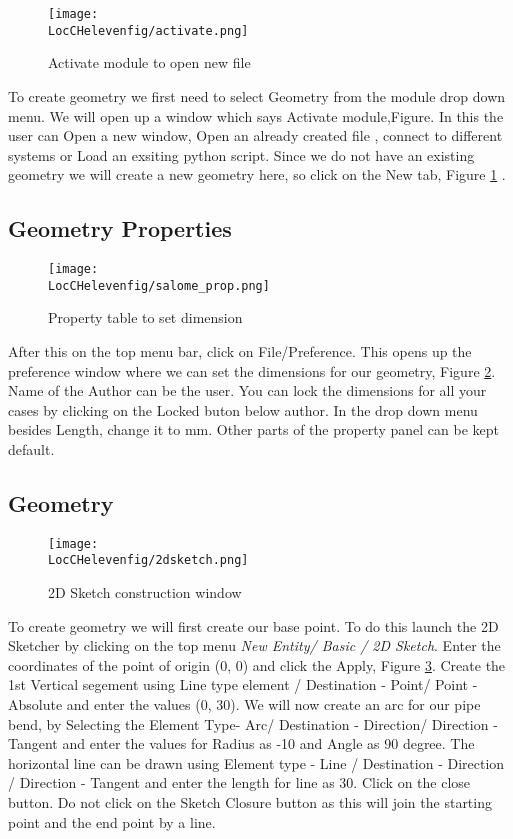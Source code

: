 \begin{figure}[h]  
\centering
\texttt{[image: \\LocCHelevenfig/activate.png]}
\caption{Activate module to open new file}
\label{activate}
\end{figure}

To create geometry we first need to select Geometry from the module drop down menu. We will open up a window which says Activate module,Figure. In this the user can Open a new window, Open an already created file , connect to different systems or Load an exsiting python script. Since we do not have an existing geometry we will create a new geometry here, so click on the New tab, Figure \ref{activate} . 

\subsection*{Geometry Properties}

\begin{figure}[h]  
\centering
\texttt{[image: \\LocCHelevenfig/salome\_prop.png]}
\caption{Property table to set dimension}
\label{prop}
\end{figure}

After this on the top menu bar, click on File/Preference. This opens up the preference window where we can set the dimensions for our geometry, Figure \ref{prop}. Name of the Author can be the user. You can lock the dimensions for all your cases by clicking on the Locked buton below author. In the drop down menu besides Length, change it to mm. Other parts of the property panel can be kept default.

\subsection*{Geometry}

\begin{figure}[h]  
\centering
\texttt{[image: \\LocCHelevenfig/2dsketch.png]}
\caption{2D Sketch construction window}
\label{point}
\end{figure}

To create geometry we will first create our base point. To do this launch the 2D Sketcher by clicking on the top menu \textit{New Entity/ Basic / 2D Sketch}. Enter the coordinates of the point of origin (0, 0) and click the Apply, Figure \ref{point}. Create the 1st Vertical segement using Line type element / Destination - Point/ Point - Absolute and enter the values (0, 30). We will now create an arc for our pipe bend, by Selecting the Element Type- Arc/ Destination - Direction/ Direction - Tangent and enter the values for Radius as -10 and Angle as 90 degree. The horizontal line can be drawn using Element type - Line / Destination - Direction / Direction - Tangent and enter the length for line as 30. Click on the close button. Do not click on the Sketch Closure button as this will join the starting point and the end point by a line.


